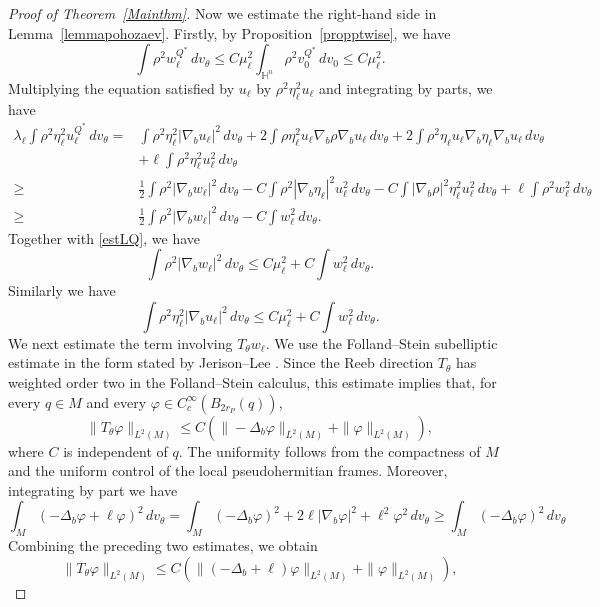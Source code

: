 \documentclass[11pt]{article}
\numberwithin{equation}{section}
\numberwithin{equation}{section}
\begin{document}
	\begin{proof}[Proof of Theorem~\ref{Mainthm}]
		Now we estimate the right-hand side in Lemma~\ref{lemmapohozaev}. Firstly, by Proposition~\ref{propptwise}, we have
		\begin{equation}\label{estLQ}
			\int \rho^2 w_\ell^{Q^*}\,dv_\theta \le C \mu_\ell^2\int_{\mathbb{H}^n} \rho^2 v_0^{Q^*}\,dv_0 \le C\mu_\ell^2.
		\end{equation}
		Multiplying the equation satisfied by \(u_\ell\) by \(\rho^2 \eta_\ell^2 u_\ell\) and integrating by parts, we have
		\[
		\begin{aligned}
			\lambda_\ell \int \rho^2 \eta_\ell^2 u_\ell^{Q^*}\,dv_\theta =& \int \rho^2 \eta_\ell^2 |\nabla_b u_\ell|^2\,dv_\theta + 2\int \rho \eta_\ell^2 u_\ell  \nabla_b \rho \nabla_b u_\ell\,dv_\theta + 2\int \rho^2 \eta_\ell u_\ell  \nabla_b \eta_\ell \nabla_b u_\ell\,dv_\theta\\
			& + \ell \int \rho^2 \eta_\ell^2 u_\ell^2\,dv_\theta\\
			\ge & \frac{1}{2}\int \rho^2|\nabla_b w_\ell|^2\,dv_\theta - C\int \rho^2 |\nabla_b \eta_\ell|^2 u_\ell^2\,dv_\theta - C\int |\nabla_b \rho|^2 \eta_\ell^2 u_\ell^2\,dv_\theta + \ell \int \rho^2 w_\ell^2\,dv_\theta\\
			\ge &\frac{1}{2}\int \rho^2|\nabla_b w_\ell|^2\,dv_\theta - C\int w_\ell^2\,dv_\theta.
		\end{aligned}
		\]
		Together with \eqref{estLQ}, we have
		\begin{equation}\label{estgrad}
			\int \rho^2 |\nabla_b w_\ell|^2\,dv_\theta \le C\mu_\ell^2 + C\int w_\ell^2\,dv_\theta.
		\end{equation}
		Similarly we have
		\begin{equation}\label{estgrad2}
			\int \rho^2 \eta_\ell^2 |\nabla_b u_\ell|^2\,dv_\theta \le C\mu_\ell^2  + C\int w_\ell^2\,dv_\theta.
		\end{equation}
		We next estimate the term involving \(T_\theta w_\ell\). We use the Folland--Stein subelliptic estimate in the form stated by Jerison--Lee \cite[Proposition 5.7(c)]{JL1987}. Since the Reeb direction \(T_\theta\) has weighted order two in the Folland--Stein calculus, this estimate implies that, for every \(q\in M\) and every \(\varphi\in C_c^\infty(B_{2r_P}(q))\),
		\[
		\|T_\theta\varphi\|_{L^2(M)} \leq C( \|-\Delta_b\varphi\|_{L^2(M)} +\|\varphi\|_{L^2(M)}),
		\]
		where \(C\) is independent of \(q\). The uniformity follows from the compactness of \(M\) and the uniform control of the local pseudohermitian frames. Moreover, integrating by part we have
		\[
		\int_M (-\Delta_b \varphi + \ell \varphi)^2\,d v_\theta = \int_M (-\Delta_b \varphi)^2 + 2 \ell |\nabla_b \varphi|^2 +  \ell^2\varphi^2\,dv_\theta \ge \int_M (-\Delta_b \varphi)^2\,d v_\theta
		\]
		Combining the preceding two estimates, we obtain
		\begin{equation}\label{Testimate}
			\|T_\theta\varphi\|_{L^2(M)} \leq C( \|(-\Delta_b+ \ell)\varphi\|_{L^2(M)} +\|\varphi\|_{L^2(M)}),
		\end{equation}
		

\end{proof}
\end{document}
